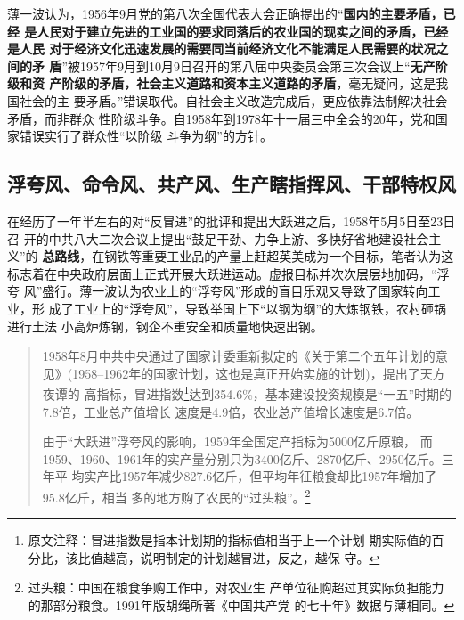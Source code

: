 薄一波认为，1956年9月党的第八次全国代表大会正确提出的“\textbf{国内的主要矛盾，已经
  是人民对于建立先进的工业国的要求同落后的农业国的现实之间的矛盾，已经是人民
  对于经济文化迅速发展的需要同当前经济文化不能满足人民需要的状况之间的矛
  盾}”被1957年9月到10月9日召开的第八届中央委员会第三次会议上“\textbf{无产阶级和资
  产阶级的矛盾，社会主义道路和资本主义道路的矛盾}，毫无疑问，这是我国社会的主
要矛盾。”错误取代。自社会主义改造完成后，更应依靠法制解决社会矛盾，而非群众
性阶级斗争。自1958年到1978年十一届三中全会的20年，党和国家错误实行了群众性“以阶级
斗争为纲”的方针。\cite[620-632]{boyibo}


\subsection{浮夸风、命令风、共产风、生产瞎指挥风、干部特权风}

在经历了一年半左右的对“反冒进”的批评和提出大跃进之后，1958年5月5日至23日召
开的中共八大二次会议上提出“鼓足干劲、力争上游、多快好省地建设社会主义”的
\textbf{总路线}，在钢铁等重要工业品的产量上赶超英美成为一个目标，笔者认为这
标志着在中央政府层面上正式开展大跃进运动。虚报目标并次次层层地加码，“浮夸
风”盛行。薄一波认为农业上的“浮夸风”形成的盲目乐观又导致了国家转向工业，形
成了工业上的“浮夸风”，导致举国上下“以钢为纲”的大炼钢铁，农村砸锅进行土法
小高炉炼钢，钢企不重安全和质量地快速出钢。

\begin{quotation}
  1958年8月中共中央通过了国家计委重新拟定的《关于第二个五年计划的意
  见》(1958--1962年的国家计划，这也是真正开始实施的计划)，提出了天方夜谭的
  高指标，冒进指数\footnote{原文注释：冒进指数是指本计划期的指标值相当于上一个计划
    期实际值的百分比，该比值越高，说明制定的计划越冒进，反之，越保
    守。}达到354.6\%，基本建设投资规模是“一五”时期的7.8倍，工业总产值增长
  速度是4.9倍，农业总产值增长速度是6.7倍。\cite{shiyiwu}

  由于“大跃进”浮夸风的影响，1959年全国定产指标为5000亿斤原粮，
  而1959、1960、1961年的实产量分别只为3400亿斤、2870亿斤、2950亿斤。三年平
  均实产比1957年减少827.6亿斤，但平均年征粮食却比1957年增加了95.8亿斤，相当
  多的地方购了农民的“过头粮”。\footnote{过头粮：中国在粮食争购工作中，对农业生
    产单位征购超过其实际负担能力的那部分粮食。1991年版胡绳所著《中国共产党
    的七十年》数据与薄相同。}\cite[278]{boyibo}
\end{quotation}


